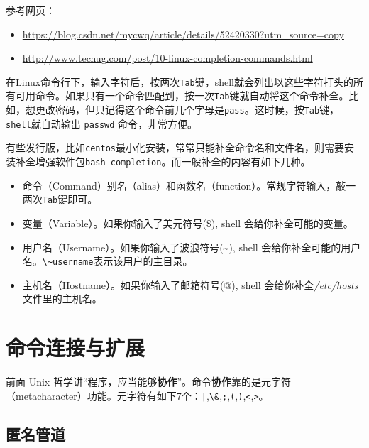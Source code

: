 \documentclass[doctor,openright,twoside]{sjtuthesis}
\providecommand{\tightlist}{%
    \setlength{\itemsep}{0pt}\setlength{\parskip}{0pt}}
\newcommand{\passthrough}[1]{#1}
\theoremstyle{plain}
\theoremstyle{definition}
\theoremstyle{remark}
\theoremstyle{ocrenumbox}
\theoremstyle{plain}
\newcommand\cqh{“}
\newcommand\cqt{”}
\begin{document}
参考网页：

\begin{itemize}
\tightlist
\item
  \url{https://blog.csdn.net/mycwq/article/details/52420330?utm_source=copy}
\item
  \url{http://www.techug.com/post/10-linux-completion-commands.html}
\end{itemize}

在Linux命令行下，输入字符后，按两次\passthrough{\lstinline!Tab!}键，shell就会列出以这些字符打头的所有可用命令。如果只有一个命令匹配到，按一次\passthrough{\lstinline!Tab!}键就自动将这个命令补全。比如，想更改密码，但只记得这个命令前几个字母是\passthrough{\lstinline!pass!}。这时候，按\passthrough{\lstinline!Tab!}键，\passthrough{\lstinline!shell!}就自动输出
\passthrough{\lstinline!passwd!} 命令，非常方便。

有些发行版，比如\passthrough{\lstinline!centos!}最小化安装，常常只能补全命令名和文件名，则需要安装补全增强软件包\passthrough{\lstinline!bash-completion!}。而一般补全的内容有如下几种。

\begin{itemize}
\tightlist
\item
  命令（Command）别名（alias）和函数名（function）。常规字符输入，敲一两次\passthrough{\lstinline!Tab!}键即可。
\item
  变量（Variable）。如果你输入了美元符号(\$), shell
  会给你补全可能的变量。
\item
  用户名（Username）。如果你输入了波浪符号(\textasciitilde{}), shell
  会给你补全可能的用户名。\passthrough{\lstinline!\~username!}表示该用户的主目录。
\item
  主机名（Hostname）。如果你输入了邮箱符号(@), shell
  会给你补全\emph{/etc/hosts}文件里的主机名。
\end{itemize}

\section{命令连接与扩展}

前面 Unix
哲学讲\cqh 程序，应当能够\textbf{协作}\cqt 。命令\textbf{协作}靠的是元字符（metacharacter）功能。元字符有如下7个：\passthrough{\lstinline!|!},\passthrough{\lstinline!\&!},\passthrough{\lstinline!;!},\passthrough{\lstinline!(!},\passthrough{\lstinline!)!},\passthrough{\lstinline!<!},\passthrough{\lstinline!>!}。

\subsection{匿名管道}
\end{document}
